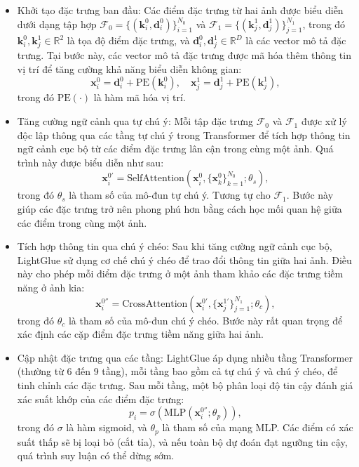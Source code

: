 \begin{itemize}
    \item Khởi tạo đặc trưng ban đầu: Các điểm đặc trưng từ hai ảnh được biểu diễn dưới dạng tập hợp $\mathcal{F}_0 = \{(\mathbf{k}_i^0, \mathbf{d}_i^0)\}_{i=1}^{N_0}$ và $\mathcal{F}_1 = \{(\mathbf{k}_j^1, \mathbf{d}_j^1)\}_{j=1}^{N_1}$, trong đó $\mathbf{k}_i^0, \mathbf{k}_j^1 \in \mathbb{R}^2$ là tọa độ điểm đặc trưng, và $\mathbf{d}_i^0, \mathbf{d}_j^1 \in \mathbb{R}^D$ là các vector mô tả đặc trưng. Tại bước này, các vector mô tả đặc trưng được mã hóa thêm thông tin vị trí để tăng cường khả năng biểu diễn không gian:
    \begin{equation}
        \mathbf{x}_i^0 = \mathbf{d}_i^0 + \text{PE}(\mathbf{k}_i^0), \quad \mathbf{x}_j^1 = \mathbf{d}_j^1 + \text{PE}(\mathbf{k}_j^1),
    \end{equation}
    trong đó $\text{PE}(\cdot)$ là hàm mã hóa vị trí.

    \item Tăng cường ngữ cảnh qua tự chú ý: 
    Mỗi tập đặc trưng $\mathcal{F}_0$ và $\mathcal{F}_1$ được xử lý độc lập thông qua các tầng tự chú ý trong Transformer để tích hợp thông tin ngữ cảnh cục bộ từ các điểm đặc trưng lân cận trong cùng một ảnh. Quá trình này được biểu diễn như sau:
    \begin{equation}
        \mathbf{x}_i^{0'} = \text{SelfAttention}(\mathbf{x}_i^0, \{\mathbf{x}_k^0\}_{k=1}^{N_0}; \theta_s),
    \end{equation}
    trong đó $\theta_s$ là tham số của mô-đun tự chú ý. Tương tự cho $\mathcal{F}_1$. Bước này giúp các đặc trưng trở nên phong phú hơn bằng cách học mối quan hệ giữa các điểm trong cùng một ảnh.

    \item Tích hợp thông tin qua chú ý chéo: 
    Sau khi tăng cường ngữ cảnh cục bộ, LightGlue sử dụng cơ chế chú ý chéo để trao đổi thông tin giữa hai ảnh. Điều này cho phép mỗi điểm đặc trưng ở một ảnh tham khảo các đặc trưng tiềm năng ở ảnh kia:
    \begin{equation}
        \mathbf{x}_i^{0''} = \text{CrossAttention}(\mathbf{x}_i^{0'}, \{\mathbf{x}_j^{1'}\}_{j=1}^{N_1}; \theta_c),
    \end{equation}
    trong đó $\theta_c$ là tham số của mô-đun chú ý chéo. Bước này rất quan trọng để xác định các cặp điểm đặc trưng tiềm năng giữa hai ảnh.

    \item Cập nhật đặc trưng qua các tầng: 
    LightGlue áp dụng nhiều tầng Transformer (thường từ 6 đến 9 tầng), mỗi tầng bao gồm cả tự chú ý và chú ý chéo, để tinh chỉnh các đặc trưng. Sau mỗi tầng, một bộ phân loại độ tin cậy đánh giá xác suất khớp của các điểm đặc trưng:
    \begin{equation}
        p_i = \sigma(\text{MLP}(\mathbf{x}_i^{0''}; \theta_p)),
    \end{equation}
    trong đó $\sigma$ là hàm sigmoid, và $\theta_p$ là tham số của mạng MLP. Các điểm có xác suất thấp sẽ bị loại bỏ (cắt tỉa), và nếu toàn bộ dự đoán đạt ngưỡng tin cậy, quá trình suy luận có thể dừng sớm.


\end{itemize}
